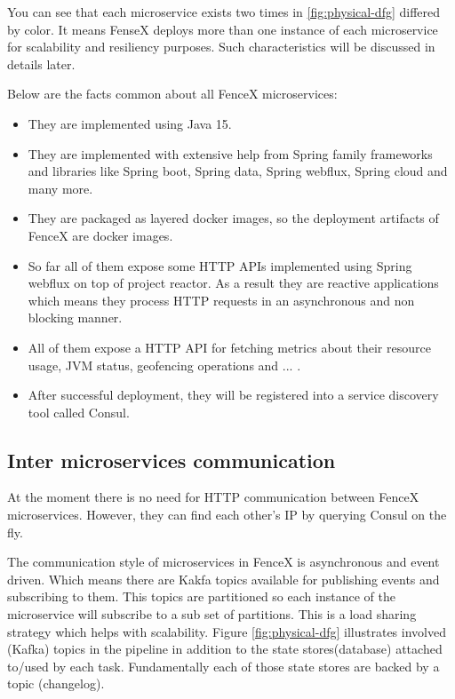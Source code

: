 \documentclass[a4]{report}
\begin{document}
    You can see that each microservice exists two times in \ref{fig:physical-dfg} differed by color.
    It means FenseX deploys more than one instance of each microservice for scalability and resiliency purposes.
    Such characteristics will be discussed in details later.

    Below are the facts common about all FenceX microservices:
    \begin{itemize}
        \item They are implemented using Java 15.
        \item They are implemented with extensive help from Spring family frameworks and libraries like Spring boot, Spring data, Spring webflux, Spring cloud and many more.
        \item They are packaged as layered docker images, so the deployment artifacts of FenceX are docker images.
        \item So far all of them expose some HTTP APIs implemented using Spring webflux on top of project reactor. As
        a result they are reactive applications which means they process HTTP requests in an asynchronous and non blocking manner.
        \item All of them expose a HTTP API for fetching metrics about their resource usage, JVM status, geofencing operations and ... .
        \item After successful deployment, they will be registered into a service discovery tool called Consul\cite{Consul}.
    \end{itemize}

    \subsection{Inter microservices communication}
    At the moment there is no need for HTTP communication between FenceX microservices.
    However, they can find each other's IP by querying Consul on the fly.

    The communication style of microservices in FenceX is asynchronous and event driven.
    Which means there are Kakfa topics available for publishing events and subscribing to them.
    This topics are partitioned so each instance of the microservice will subscribe to a sub set of partitions.
    This is a load sharing strategy which helps with scalability.
    Figure \ref{fig:physical-dfg} illustrates involved (Kafka) topics in the pipeline in addition to the state
    stores(database) attached to/used by each task.
    Fundamentally each of those state stores are backed by a topic (changelog).
\end{document}
